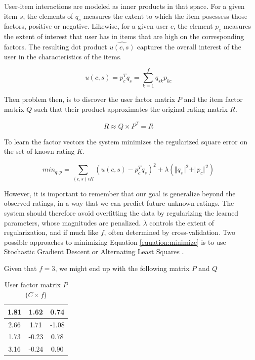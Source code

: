 User-item interactions are modeled as inner products in that space. For a given item $s$, the elements of $q_{s}$ measures the extent to which the item posessess those factors, positive or negative. Likewise, for a given user $c$, the element $p_{c}$ measures the extent of interest that user has in items that are high on the corresponding factors. The resulting dot product $\hat{u(c,s)}$ captures the overall interest of the user in the characteristics of the items.

\begin{equation}
u(c,s) = p_{c}^{T}q_{s} = \sum_{k=1}^{f} q_{sk}p_{kc}
\end{equation}

Then problem then, is to discover the user factor matrix $P$ and the item factor matrix $Q$ such that their product approximates the original rating matrix $R$.

\begin{equation}
R \approx Q \times P^{T} = \hat{R}
\end{equation}

To learn the factor vectors the system minimizes the regularized square error on the set of known rating $K$.

\begin{equation}
\label{equation:minimize}
min_{q, p} = \sum_{(c,s)\epsilon K} (u(c,s) - p^{T}_{c}q_{s})^{2} + \lambda ( \Vert q_{s} \Vert ^{2} + \Vert p_{c} \Vert ^{2})
\end{equation}

However, it is important to remember that our goal is generalize beyond the observed ratings, in a way that we can predict future unknown ratings. The system should therefore avoid overfitting the data by regularizing the learned parameters, whose magnitudes are penalized. $\lambda$ controls the extent of regularization, and if much like $f$, often determined by cross-validation. Two possible approaches to minimizing Equation \ref{equation:minimize} is to use Stochastic Gradient Descent or Alternating Least Squares \citep{Koren2009}.

Given that $f = 3$, we might end up with the following matrix $P$ and $Q$

\begin{table}[!htbp]
\centering
\begin{tabular}{|c|c|c|}
\hline
1.81	&1.62	&0.74\\ \hline
2.66	&1.71	&-1.08\\ \hline
1.73	&-0.23	&0.78\\ \hline
3.16	&-0.24	&0.90\\ \hline
\end{tabular}
\label{table:ItemFeature}
\caption{User factor matrix $P$ ($C \times f$)}
\end{table} 

